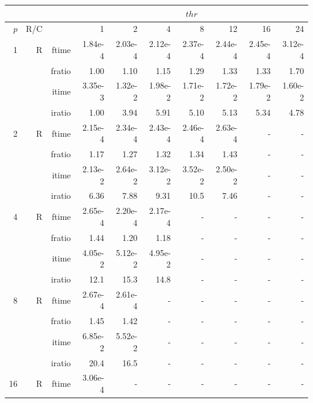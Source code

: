 \documentclass[a4paper]{article}
\begin{document}
\begin{table}[htbp]
\begin{center}
\begin{small}
\begin{tabular}{|r|r|r|r|r|r|r|r|r|r|}
\hline 
     & & & \multicolumn{7}{c|}{$thr$} \\ \hline
    $p$ & R/C &  & 1           & 2    & 4    & 8    & 12   & 16    & 24  \\ \hline\hline
   1 &  R &  ftime &   1.84e-4 &   2.03e-4 &   2.12e-4 &   2.37e-4 &   2.44e-4 &   2.45e-4 &   3.12e-4 \\
           &          & fratio &   1.00 &   1.10 &   1.15 &   1.29 &   1.33 &   1.33 &   1.70 \\
           &          & itime &   3.35e-3 &   1.32e-2 &   1.98e-2 &   1.71e-2 &   1.72e-2 &   1.79e-2 &   1.60e-2 \\
           &          & iratio &   1.00 &   3.94 &   5.91 &   5.10 &   5.13 &   5.34 &   4.78 \\\hline
   2 &  R &  ftime &   2.15e-4 &   2.34e-4 &   2.43e-4 &   2.46e-4 &   2.63e-4 &  - &  - \\
           &          & fratio &   1.17 &   1.27 &   1.32 &   1.34 &   1.43 &  - &  - \\
           &          & itime &   2.13e-2 &   2.64e-2 &   3.12e-2 &   3.52e-2 &   2.50e-2 &  - &  - \\
           &          & iratio &   6.36 &   7.88 &   9.31 &   10.5 &   7.46 &  - &  - \\\hline
   4 &  R &  ftime &   2.65e-4 &   2.20e-4 &   2.17e-4 &  - &  - &  - &  - \\
           &          & fratio &   1.44 &   1.20 &   1.18 &  - &  - &  - &  - \\
           &          & itime &   4.05e-2 &   5.12e-2 &   4.95e-2 &  - &  - &  - &  - \\
           &          & iratio &   12.1 &   15.3 &   14.8 &  - &  - &  - &  - \\\hline
   8 &  R &  ftime &   2.67e-4 &   2.61e-4 &  - &  - &  - &  - &  - \\
           &          & fratio &   1.45 &   1.42 &  - &  - &  - &  - &  - \\
           &          & itime &   6.85e-2 &   5.52e-2 &  - &  - &  - &  - &  - \\
           &          & iratio &   20.4 &   16.5 &  - &  - &  - &  - &  - \\\hline
   16 & R &  ftime &   3.06e-4 &  - &  - &  - &  - &  - &  - \\

\end{tabular}
\end{small}
\end{center}
\end{table}
\end{document}
